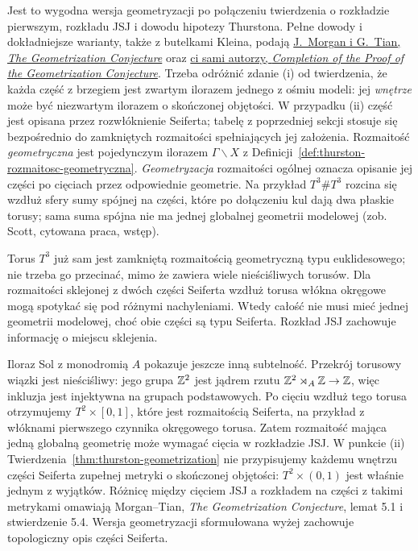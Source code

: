 Jest to wygodna wersja geometryzacji po połączeniu
twierdzenia o rozkładzie pierwszym, rozkładu JSJ
i dowodu hipotezy Thurstona. Pełne dowody i dokładniejsze
warianty, także z butelkami Kleina, podają
\href{https://www.claymath.org/wp-content/uploads/2022/03/Geom.pdf}
{J.\ Morgan i G.\ Tian, \emph{The Geometrization Conjecture}}
oraz \href{https://arxiv.org/pdf/0809.4040}
{ci sami autorzy, \emph{Completion of the Proof of the
Geometrization Conjecture}}. Trzeba odróżnić zdanie (i)
od twierdzenia, że każda część z brzegiem jest zwartym
ilorazem jednego z ośmiu modeli: jej \emph{wnętrze}
może być niezwartym ilorazem o skończonej objętości.
W przypadku (ii) część jest opisana przez rozwłóknienie
Seiferta; tabelę z poprzedniej sekcji stosuje się bezpośrednio
do zamkniętych rozmaitości spełniających jej założenia.
Rozmaitość \emph{geometryczna} jest pojedynczym ilorazem
$\Gamma\backslash X$ z Definicji~\ref{def:thurston-rozmaitosc-geometryczna}.
\emph{Geometryzacja} rozmaitości ogólnej oznacza opisanie jej
części po cięciach przez odpowiednie geometrie. Na przykład
$T^3\#T^3$ rozcina się wzdłuż sfery sumy spójnej na części,
które po dołączeniu kul dają dwa płaskie torusy; sama suma
spójna nie ma jednej globalnej geometrii modelowej
(zob. Scott, cytowana praca, wstęp).

\begin{przyklad}
\label{prz:thurston-cut}
Torus $T^3$ już sam jest zamkniętą rozmaitością geometryczną
typu euklidesowego;
nie trzeba go przecinać, mimo że zawiera wiele nieściśliwych
torusów. Dla rozmaitości sklejonej z dwóch części Seiferta
wzdłuż torusa włókna okręgowe mogą spotykać się pod różnymi
nachyleniami. Wtedy całość nie musi mieć jednej geometrii
modelowej, choć obie części są typu Seiferta. Rozkład JSJ
zachowuje informację o miejscu sklejenia.

Iloraz Sol z monodromią $A$ pokazuje jeszcze inną subtelność.
Przekrój torusowy wiązki jest nieściśliwy: jego grupa $\mathbb{Z}^2$
jest jądrem rzutu $\mathbb{Z}^2\rtimes_A\mathbb{Z}\to\mathbb{Z}$, więc inkluzja
jest injektywna na grupach podstawowych. Po cięciu wzdłuż
tego torusa otrzymujemy $T^2\times[0,1]$, które jest
rozmaitością Seiferta, na przykład z włóknami pierwszego
czynnika okręgowego torusa. Zatem rozmaitość mająca jedną
globalną geometrię może wymagać cięcia w rozkładzie JSJ.
W punkcie (ii) Twierdzenia~\ref{thm:thurston-geometrization}
nie przypisujemy każdemu wnętrzu części Seiferta zupełnej
metryki o skończonej objętości: $T^2\times(0,1)$ jest
właśnie jednym z wyjątków. Różnicę między cięciem JSJ
a rozkładem na części z takimi metrykami omawiają
Morgan--Tian, \emph{The Geometrization Conjecture},
lemat 5.1 i stwierdzenie 5.4. Wersja geometryzacji
sformułowana wyżej zachowuje topologiczny opis części Seiferta.
\end{przyklad}

